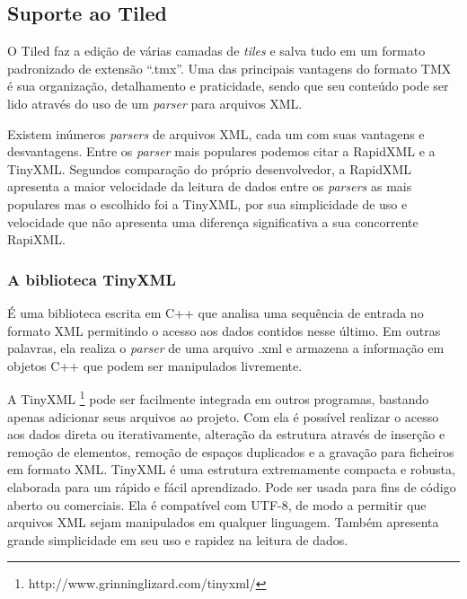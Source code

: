 \subsection{Suporte ao Tiled}
%
O Tiled faz a edição de várias camadas de \textit{tiles} e salva tudo em um formato padronizado de extensão ``.tmx''. Uma das principais vantagens do formato TMX é sua organização, detalhamento e praticidade, sendo que seu conteúdo pode ser lido através do uso de um \textit{parser} para arquivos XML.
\par 
Existem inúmeros \textit{parsers} de arquivos XML, cada um com suas vantagens e desvantagens. Entre os \textit{parser} mais populares podemos citar a RapidXML e a TinyXML. Segundos comparação do próprio desenvolvedor, a RapidXML apresenta a maior velocidade da leitura de dados entre os \textit{parsers} as mais populares mas o escolhido foi a TinyXML, por sua simplicidade de uso e velocidade que não apresenta uma diferença significativa a sua concorrente RapiXML. 
%
%
\subsubsection{A biblioteca TinyXML}
\label{tinyXML}
%
É uma biblioteca escrita em C++ que analisa uma sequência de entrada no formato XML permitindo o acesso aos dados contidos nesse último. Em outras palavras, ela realiza o \textit{parser} de uma arquivo .xml e armazena a informação em objetos C++ que podem ser manipulados livremente. 
\par 
A TinyXML \footnote{http://www.grinninglizard.com/tinyxml/} pode ser facilmente integrada em outros programas, bastando apenas adicionar seus 
arquivos ao projeto. Com ela é possível realizar o acesso aos dados direta ou iterativamente, alteração da estrutura através 
de inserção e remoção de elementos, remoção de espaços duplicados e a gravação para ficheiros em formato XML.
TinyXML é uma estrutura extremamente compacta e robusta, elaborada para um rápido e fácil aprendizado. Pode ser usada para 
fins de código aberto ou comerciais. Ela é compatível com UTF-8, de modo a permitir que arquivos XML sejam manipulados em 
qualquer linguagem. Também apresenta grande simplicidade em seu uso e rapidez na leitura de dados.
%
%
